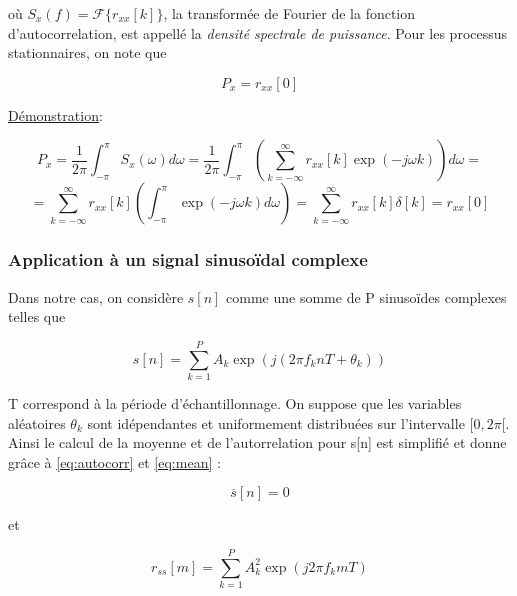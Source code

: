 \documentclass{article}
\begin{document}
\begin{itemize}
où \(S_x(f) = \mathcal{F} \{r_{xx}[k]\}\), la transformée de Fourier de la fonction d'autocorrelation, est appellé la \textit{densité spectrale de puissance}. Pour les processus stationnaires, on note que

\begin{equation}
    \label{eq:puissance}
    P_x = r_{xx} [0]
\end{equation}

\underline{Démonstration}:

\[ P_x = \frac{1}{2\pi} \int_{-\pi}^{\pi}  S_x (\omega) d\omega = \frac{1}{2\pi} \int_{-\pi}^{\pi} \left( \sum_{k = - \infty}^{\infty} r_{xx}[k] \exp(-j \omega k) \right) d\omega  = \]  
\[ = \sum_{k = - \infty}^{\infty} r_{xx}[k]  \left( \int_{-\pi}^{\pi}  \exp(-j \omega k) d\omega \right) = \sum_{k = - \infty}^{\infty} r_{xx}[k] \delta [k] = r_{xx} [0] \]

\end{itemize}


\newpage

\subsubsection{Application à un signal sinusoïdal complexe}

Dans notre cas, on considère \(s[n]\) comme une somme de P sinusoïdes complexes telles que 

\begin{equation}
\label{eq:x}
    s[n] = \sum_{k=1}^{P} A_k \exp(j(2\pi f_k n T + \theta _k))
\end{equation}

T correspond à la période d'échantillonnage.
On suppose que les variables aléatoires \(\theta _k\) sont idépendantes et uniformement distribuées sur l'intervalle \( [0, 2\pi[\). Ainsi le calcul de la moyenne et de l'autorrelation pour s[n] est simplifié et donne grâce à \ref{eq:autocorr} et \ref{eq:mean} : 

\begin{equation}
\label{eq:meanx}
    \overline{s}[n] = 0
\end{equation}

et

\begin{equation}
\label{eq:rxx}
    r_{ss}[m] = \sum_{k=1}^{P} A_k^2 \exp(j 2\pi f_k m T)
\end{equation}
\end{document}
